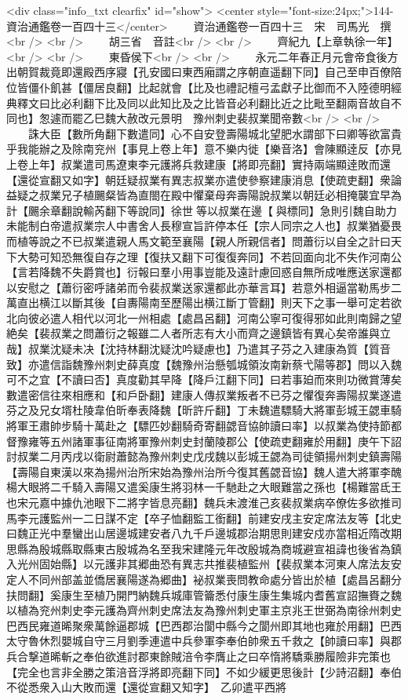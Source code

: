 <div class="info_txt clearfix" id="show">
<center style="font-size:24px;">144-資治通鑑卷一百四十三</center>
  　　資治通鑑卷一百四十三　宋　司馬光　撰<br />
<br />
　　胡三省　音註<br />
<br />
　　齊紀九【上章執徐一年】<br />
<br />
　　東昏侯下<br />
<br />
　　永元二年春正月元會帝食後方出朝賀裁竟即還殿西序寢【孔安國曰東西廂謂之序朝直遥翻下同】自己至申百僚陪位皆僵仆飢甚【僵居良翻】比起就會【比及也禮記檀弓孟獻子比御而不入陸德明經典釋文曰比必利翻下比及同以此知比及之比皆音必利翻比近之比毗至翻兩音故自不同也】怱遽而罷乙巳魏大赦改元景明　豫州刺史裴叔業聞帝數<br />
<br />
　　誅大臣【數所角翻下數遣同】心不自安登壽陽城北望肥水謂部下曰卿等欲富貴乎我能辦之及除南兖州【事見上卷上年】意不樂内徙【樂音洛】會陳顯逹反【亦見上卷上年】叔業遣司馬遼東李元護將兵救建康【將即亮翻】實持兩端顯逹敗而還【還從宣翻又如字】朝廷疑叔業有異志叔業亦遣使參察建康消息【使疏吏翻】衆論益疑之叔業兄子植颺粲皆為直閤在殿中懼棄母奔壽陽說叔業以朝廷必相掩襲宜早為計【颺余章翻說輸芮翻下等說同】徐世等以叔業在邊【與標同】急則引魏自助力未能制白帝遣叔業宗人中書舍人長穆宣旨許停本任【宗人同宗之人也】叔業猶憂畏而植等說之不已叔業遣親人馬文範至襄陽【親人所親信者】問蕭衍以自全之計曰天下大勢可知恐無復自存之理【復扶又翻下可復復奔同】不若回面向北不失作河南公【言若降魏不失爵賞也】衍報曰羣小用事豈能及遠計慮回惑自無所成唯應送家還都以安慰之【蕭衍密呼諸弟而令裴叔業送家還都此亦華言耳】若意外相逼當勒馬步二萬直出横江以斷其後【自夀陽南至歷陽出横江斷丁管翻】則天下之事一舉可定若欲北向彼必遣人相代以河北一州相處【處昌呂翻】河南公寧可復得邪如此則南歸之望絶矣【裴叔業之問蕭衍之報雖二人者所志有大小而齊之邊鎮皆有異心矣帝誰與立哉】叔業沈疑未决【沈持林翻沈疑沈吟疑慮也】乃遣其子芬之入建康為質【質音致】亦遣信詣魏豫州刺史薛真度【魏豫州治懸瓠城領汝南新蔡弋陽等郡】問以入魏可不之宜【不讀曰否】真度勸其早降【降戶江翻下同】曰若事廹而來則功微賞薄矣數遣密信往來相應和【和戶卧翻】建康人傳叔業叛者不已芬之懼復奔壽陽叔業遂遣芬之及兄女壻杜陵韋伯昕奉表降魏【昕許斤翻】丁未魏遣驃騎大將軍彭城王勰車騎將軍王肅帥步騎十萬赴之【驃匹妙翻騎奇寄翻勰音協帥讀曰率】以叔業為使持節都督豫雍等五州諸軍事征南將軍豫州刺史封蘭陵郡公【使疏吏翻雍於用翻】庚午下詔討叔業二月丙戌以衛尉蕭懿為豫州刺史戊戌魏以彭城王勰為司徒領揚州刺史鎮壽陽【壽陽自東漢以來為揚州治所宋始為豫州治所今復其舊勰音協】魏人遣大將軍李醜楊大眼將二千騎入壽陽又遣奚康生將羽林一千馳赴之大眼難當之孫也【楊難當氐王也宋元嘉中據仇池眼下二將字皆息亮翻】魏兵未渡淮己亥裴叔業病卒僚佐多欲推司馬李元護監州一二日謀不定【卒子恤翻監工銜翻】前建安戌主安定席法友等【北史曰魏正光中羣蠻出山居邊城建安者八九千戶邊城郡治期思則建安戍亦當相近隋改期思縣為殷城縣取縣東古殷城為名至我宋建隆元年改殷城為商城避宣祖諱也後省為鎮入光州固始縣】以元護非其郷曲恐有異志共推裴植監州【裴叔業本河東人席法友安定人不同州部盖並僑居襄陽遂為郷曲】袐叔業喪問教命處分皆出於植【處昌呂翻分扶問翻】奚康生至植乃開門納魏兵城庫管籥悉付康生康生集城内耆舊宣詔撫賚之魏以植為兖州刺史李元護為齊州刺史席法友為豫州刺史軍主京兆王世弼為南徐州刺史　巴西民雍道晞聚衆萬餘逼郡城【巴西郡治閬中縣今之閬州即其地也雍於用翻】巴西太守魯休烈嬰城自守三月劉季連遣中兵參軍李奉伯帥衆五千救之【帥讀曰率】與郡兵合撃道晞斬之奉伯欲進討郡東餘賊涪令李膺止之曰卒惰將驕乘勝履險非完策也【完全也言非全勝之策涪音浮將即亮翻下同】不如少緩更思後計【少詩沼翻】奉伯不從悉衆入山大敗而還【還從宣翻又知字】　乙卯遣平西將
